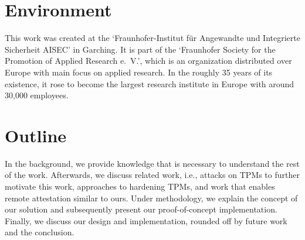 \section{Environment}

This work was created at the `Fraunhofer-Institut für Angewandte und Integrierte Sicherheit AISEC' in Garching.
It is part of the `Fraunhofer Society for the Promotion of Applied Research e.~V.', which is an organization distributed over Europe with main focus on applied research.
In the roughly 35 years of its existence, it rose to become the largest research institute in Europe with around 30,000 employees.

\section{Outline}

In the background, we provide knowledge that is necessary to understand the rest of the work.
Afterwards, we discuss related work, i.e., attacks on TPMs to further motivate this work, approaches to hardening TPMs, and work that enables remote attestation similar to ours.
Under methodology, we explain the concept of our solution and subsequently present our proof-of-concept implementation.
Finally, we discuss our design and implementation, rounded off by future work and the conclusion.
